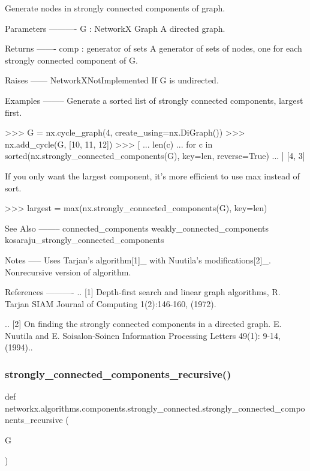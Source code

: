 \begin{DoxyVerb}Generate nodes in strongly connected components of graph.

Parameters
----------
G : NetworkX Graph
    A directed graph.

Returns
-------
comp : generator of sets
    A generator of sets of nodes, one for each strongly connected
    component of G.

Raises
------
NetworkXNotImplemented
    If G is undirected.

Examples
--------
Generate a sorted list of strongly connected components, largest first.

>>> G = nx.cycle_graph(4, create_using=nx.DiGraph())
>>> nx.add_cycle(G, [10, 11, 12])
>>> [
...     len(c)
...     for c in sorted(nx.strongly_connected_components(G), key=len, reverse=True)
... ]
[4, 3]

If you only want the largest component, it's more efficient to
use max instead of sort.

>>> largest = max(nx.strongly_connected_components(G), key=len)

See Also
--------
connected_components
weakly_connected_components
kosaraju_strongly_connected_components

Notes
-----
Uses Tarjan's algorithm[1]_ with Nuutila's modifications[2]_.
Nonrecursive version of algorithm.

References
----------
.. [1] Depth-first search and linear graph algorithms, R. Tarjan
   SIAM Journal of Computing 1(2):146-160, (1972).

.. [2] On finding the strongly connected components in a directed graph.
   E. Nuutila and E. Soisalon-Soinen
   Information Processing Letters 49(1): 9-14, (1994)..\end{DoxyVerb}
 \mbox{\label{namespacenetworkx_1_1algorithms_1_1components_1_1strongly__connected_af353ab76656c8a36fbd11da71dd74bfa}} 
\subsubsection{\texorpdfstring{strongly\+\_\+connected\+\_\+components\+\_\+recursive()}{strongly\_connected\_components\_recursive()}}
{\footnotesize\ttfamily def networkx.\+algorithms.\+components.\+strongly\+\_\+connected.\+strongly\+\_\+connected\+\_\+components\+\_\+recursive (\begin{DoxyParamCaption}\item[{}]{G }\end{DoxyParamCaption})}


